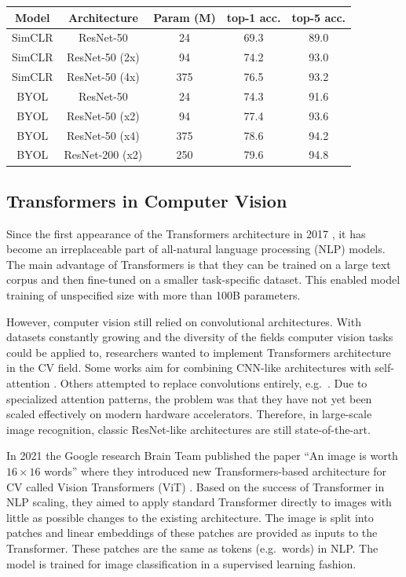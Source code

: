 \documentclass[
]{krantz}
\begin{document}
\begin{longtable}[]{@{}ccccc@{}}
\toprule
Model & Architecture & Param (M) & top-1 acc. & top-5 acc.\tabularnewline
\midrule
\endhead
SimCLR & ResNet-50 & 24 & 69.3 & 89.0\tabularnewline
SimCLR & ResNet-50 (2x) & 94 & 74.2 & 93.0\tabularnewline
SimCLR & ResNet-50 (4x) & 375 & 76.5 & 93.2\tabularnewline
BYOL & ResNet-50 & 24 & 74.3 & 91.6\tabularnewline
BYOL & ResNet-50 (x2) & 94 & 77.4 & 93.6\tabularnewline
BYOL & ResNet-50 (x4) & 375 & 78.6 & 94.2\tabularnewline
BYOL & ResNet-200 (x2) & 250 & 79.6 & 94.8\tabularnewline
\bottomrule
\end{longtable}

\hypertarget{transformers-in-computer-vision}{%
\subsection{Transformers in Computer Vision}\label{transformers-in-computer-vision}}

Since the first appearance of the Transformers architecture in 2017 \citet{TRANSFORMERS_NLP}, it has become an irreplaceable part of all-natural language processing (NLP) models. The main advantage of Transformers is that they can be trained on a large text corpus and then fine-tuned on a smaller task-specific dataset. This enabled model training of unspecified size with more than 100B parameters.

However, computer vision still relied on convolutional architectures. With datasets constantly growing and the diversity of the fields computer vision tasks could be applied to, researchers wanted to implement Transformers architecture in the CV field. Some works aim for combining CNN-like architectures with self-attention \citep{wang}. Others attempted to replace convolutions entirely, e.g.~\citet{selfa}. Due to specialized attention patterns, the problem was that they have not yet been scaled effectively on modern hardware accelerators. Therefore, in large-scale image recognition, classic ResNet-like architectures are still state-of-the-art.

In 2021 the Google research Brain Team published the paper ``An image is worth \(16\times 16\) words'' where they introduced new Transformers-based architecture for CV called Vision Transformers (ViT) \citep{vit}. Based on the success of Transformer in NLP scaling, they aimed to apply standard Transformer directly to images with little as possible changes to the existing architecture. The image is split into patches and linear embeddings of these patches are provided as inputs to the Transformer.
These patches are the same as tokens (e.g.~words) in NLP. The model is trained for image classification in a supervised learning fashion.
\end{document}
